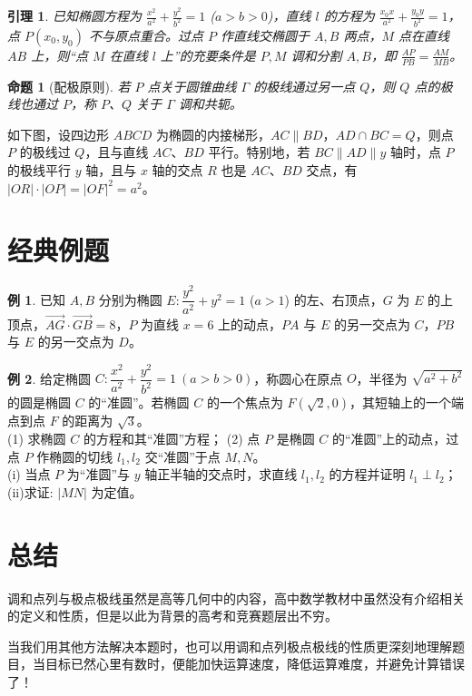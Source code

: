\documentclass[UTF8,12pt]{ctexart}
\theoremstyle{plain} %
\newtheorem{lemma}{引理}[section]
\newtheorem{proposition}{命题}[section]
\theoremstyle{definition} %
\newtheorem{example}{例}[section] %
\theoremstyle{remark} %
\begin{document}
\begin{lemma}
已知椭圆方程为 $\frac{x^2}{a^2} + \frac{y^2}{b^2} = 1$ ($a > b > 0$)，直线 $l$ 的方程为 $\frac{x_0 x}{a^2} + \frac{y_0 y}{b^2} = 1$，点 $P(x_0, y_0)$ 不与原点重合。过点 $P$ 作直线交椭圆于 $A, B$ 两点，$M$ 点在直线 $AB$ 上，则“点 $M$ 在直线 $l$ 上”的充要条件是 $P, M$ 调和分割 $A, B$，即 $\frac{AP}{PB} = \frac{AM}{MB}$。
\end{lemma}

\begin{proposition}[配极原则]
若 $P$ 点关于圆锥曲线 $\Gamma$ 的极线通过另一点 $Q$，则 $Q$ 点的极线也通过 $P$，称 $P$、$Q$ 关于 $\Gamma$ 调和共轭。
\end{proposition}

如下图，设四边形 $ABCD$ 为椭圆的内接梯形，$AC \parallel BD$，$AD \cap BC = Q$，则点 $P$ 的极线过 $Q$，且与直线 $AC$、$BD$ 平行。特别地，若 $BC \parallel AD \parallel y$ 轴时，点 $P$ 的极线平行 $y$ 轴，且与 $x$ 轴的交点 $R$ 也是 $AC$、$BD$ 交点，有 $|OR| \cdot |OP| = |OF|^2 = a^2$。

\section{经典例题}
\setcounter{example}{4}
\begin{example}
已知 $A,B$ 分别为椭圆 $E:\dfrac{y^{2}}{a^{2}}+y^{2}=1$ ($a>1$) 的左、右顶点，$G$ 为 $E$ 的上顶点，$\overrightarrow{AG}\cdot\overrightarrow{GB}=8$，$P$ 为直线 $x=6$ 上的动点，$PA$ 与 $E$ 的另一交点为 $C$，$PB$ 与 $E$ 的另一交点为 $D$。
\end{example}

\begin{example}
给定椭圆 \( C: \dfrac{x^2}{a^2} + \dfrac{y^2}{b^2} = 1 \ (a > b > 0) \)，称圆心在原点 \( O \)，半径为 \( \sqrt{a^2 + b^2} \) 的圆是椭圆 \( C \) 的“准圆”。若椭圆 \( C \) 的一个焦点为 \( F(\sqrt{2}, 0) \)，其短轴上的一个端点到点 \( F \) 的距离为 \( \sqrt{3} \)。\\
(1) 求椭圆 \( C \) 的方程和其“准圆”方程；
(2) 点 \( P \) 是椭圆 \( C \) 的“准圆”上的动点，过点 \( P \) 作椭圆的切线 \( l_1, l_2 \) 交“准圆”于点 \( M, N \)。\\
\qquad (i) 当点 \( P \) 为“准圆”与 \( y \) 轴正半轴的交点时，求直线 \( l_1, l_2 \) 的方程并证明 \( l_1 \perp l_2 \)；\\
\qquad (ii)求证: \( |MN| \) 为定值。
\end{example}

\section{总结}
调和点列与极点极线虽然是高等几何中的内容，高中数学教材中虽然没有介绍相关的定义和性质，但是以此为背景的高考和竞赛题层出不穷。

当我们用其他方法解决本题时，也可以用调和点列极点极线的性质更深刻地理解题目，当目标已然心里有数时，便能加快运算速度，降低运算难度，并避免计算错误了！
\end{document}
